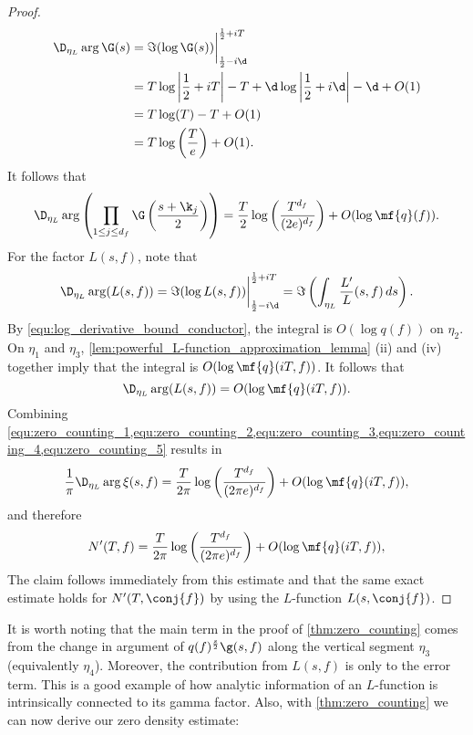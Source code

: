 \begin{proof}
\begin{align*}
        \D_{\eta_{L}}\arg\G(s) &= \Im(\log\G(s))\bigg|_{\frac{1}{2}-i\d}^{\frac{1}{2}+iT} \\
        &= T\log\left|\frac{1}{2}+iT\right|-T+\d\log\left|\frac{1}{2}+i\d\right|-\d+O(1) \\
        &= T\log(T)-T+O(1) \\
        &= T\log\left(\frac{T}{e}\right)+O(1).
      \end{align*}
      It follows that
      \begin{equation}\label{equ:zero_counting_4}
        \D_{\eta_{L}}\arg\left(\prod_{1 \le j \le d_{f}}\G\left(\frac{s+\k_{j}}{2}\right)\right) = \frac{T}{2}\log\left(\frac{T^{d_{f}}}{(2e)^{d_{f}}}\right)+O(\log{\mf{q}(f)}).
      \end{equation}
      For the factor $L(s,f)$, note that
      \[
        \D_{\eta_{L}}\arg(L(s,f)) = \Im(\log{L(s,f)})\bigg|_{\frac{1}{2}-i\d}^{\frac{1}{2}+iT} = \Im\left(\int_{\eta_{L}}\frac{L'}{L}(s,f)\,ds\right).
      \]
      By \cref{equ:log_derivative_bound_conductor}, the integral is $O(\log{q(f)})$ on $\eta_{2}$. On $\eta_{1}$ and $\eta_{3}$, \cref{lem:powerful_L-function_approximation_lemma} (ii) and (iv) together imply that the integral is $O(\log{\mf{q}(iT,f)})$. It follows that
      \begin{equation}\label{equ:zero_counting_5}
        \D_{\eta_{L}}\arg(L(s,f)) = O(\log{\mf{q}(iT,f)}).
      \end{equation}
      Combining \cref{equ:zero_counting_1,equ:zero_counting_2,equ:zero_counting_3,equ:zero_counting_4,equ:zero_counting_5} results in
      \[
        \frac{1}{\pi}\D_{\eta_{L}}\arg\xi(s,f) = \frac{T}{2\pi}\log\left(\frac{T^{d_{f}}}{(2\pi e)^{d_{f}}}\right)+O(\log{\mf{q}(iT,f)}),
      \]
      and therefore
      \[
        N'(T,f) = \frac{T}{2\pi}\log\left(\frac{T^{d_{f}}}{(2\pi e)^{d_{f}}}\right)+O(\log{\mf{q}(iT,f)}),
      \]
      The claim follows immediately from this estimate and that the same exact estimate holds for $N'(T,\conj{f})$ by using the $L$-function $L(s,\conj{f})$.
    \end{proof}

    It is worth noting that the main term in the proof of \cref{thm:zero_counting} comes from the change in argument of $q(f)^{\frac{s}{2}}\g(s,f)$ along the vertical segment $\eta_{3}$ (equivalently $\eta_{4}$). Moreover, the contribution from $L(s,f)$ is only to the error term. This is a good example of how analytic information of an $L$-function is intrinsically connected to its gamma factor. Also, with \cref{thm:zero_counting} we can now derive our zero density estimate:


